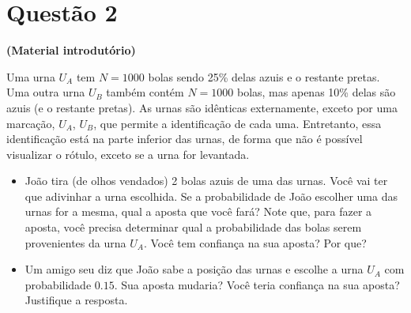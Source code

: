 \documentclass[12 pt]{article}
\begin{document}
\section*{Questão 2}
\textbf{(Material introdutório)}

Uma urna $U_A$ tem $N = 1000$ bolas sendo 25\% delas azuis e o restante pretas. Uma outra urna $U_B$ também contém $N = 1000$ bolas, mas apenas 10\% delas são azuis (e o restante pretas). As urnas são idênticas externamente, exceto por uma marcação, $U_A$, $U_B$, que permite a identificação de cada uma. Entretanto, essa identificação está na parte inferior das urnas, de forma que não é possível visualizar o rótulo, exceto se a urna for levantada.

\begin{itemize}
    \item João tira (de olhos vendados) 2 bolas azuis de uma das urnas. Você vai ter que adivinhar a urna escolhida. Se a probabilidade de João escolher uma das urnas for a mesma, qual a aposta que você fará? Note que, para fazer a aposta, você precisa determinar qual a probabilidade das bolas serem provenientes da urna $U_A$. Você tem confiança na sua aposta? Por que?
    \item Um amigo seu diz que João sabe a posição das urnas e escolhe a urna $U_A$ com probabilidade $0.15$. Sua aposta mudaria? Você teria confiança na sua aposta? Justifique a resposta.
\end{itemize}
\end{document}
